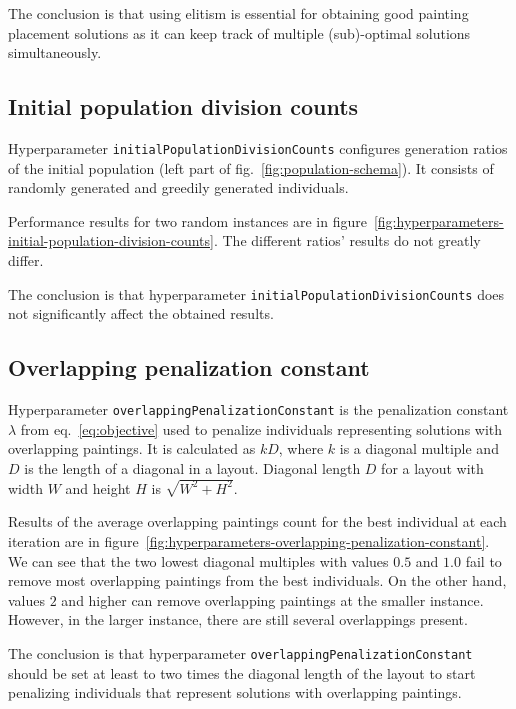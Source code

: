 The conclusion is that using elitism is essential for obtaining good painting placement solutions
as it can keep track of multiple (sub)-optimal solutions simultaneously.

\subsection{Initial population division counts}\label{subsec:initial-population-division-counts}
Hyperparameter \verb|initialPopulationDivisionCounts| configures generation ratios of the initial population (left part of fig.~\ref{fig:population-schema}).
It consists of randomly generated and greedily generated individuals.

Performance results for two random instances are in figure~\ref{fig:hyperparameters-initial-population-division-counts}.
The different ratios' results do not greatly differ.

The conclusion is that hyperparameter \verb|initialPopulationDivisionCounts| does not significantly affect the obtained results.

\subsection{Overlapping penalization constant}\label{subsec:overlapping-penalization-constant}

Hyperparameter \verb|overlappingPenalizationConstant| is the penalization constant $\lambda$ from eq.~\ref{eq:objective} used to penalize individuals representing solutions with overlapping paintings.
It is calculated as $kD$, where $k$ is a diagonal multiple and $D$ is the length of a diagonal in a layout.
Diagonal length $D$ for a layout with width $W$ and height  $H$ is $\sqrt{W^2 + H^2}$.

Results of the average overlapping paintings count for the best individual at each iteration are in figure~\ref{fig:hyperparameters-overlapping-penalization-constant}.
We can see that the two lowest diagonal multiples with values $0.5$ and $1.0$ fail to remove most overlapping paintings from the best individuals.
On the other hand, values $2$ and higher can remove overlapping paintings at the smaller instance.
However, in the larger instance, there are still several overlappings present.

The conclusion is that hyperparameter \verb|overlappingPenalizationConstant| should be set at least to
two times the diagonal length of the layout to start penalizing individuals that represent solutions with overlapping paintings.

